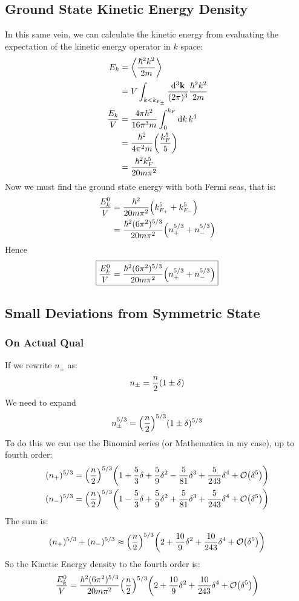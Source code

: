 \documentclass[12pt]{article}
\theoremstyle{plain}
\theoremstyle{definition}
\begin{document}
\subsection{Ground State Kinetic Energy Density}
In this same vein, we can calculate the kinetic energy from evaluating the expectation of the kinetic energy operator in $k$ space:
\begin{align*}
  E_k&=\ev{\frac{\hbar^2k^2}{2m}}\\
  &=V\int_{k<k_{F_\pm}}\frac{\dd[3]{\vb{k}}}{(2\pi)^3}\frac{\hbar^2k^2}{2m}\\
  \frac{E_k}{V}&=\frac{4\pi\hbar^2}{16\pi^3m}\int_0^{k_F}\dd{k}k^4\\
  &=\frac{\hbar^2}{4\pi^2m}\qty(\frac{k_F^5}{5})\\
  &=\frac{\hbar^2k_F^5}{20m\pi^2}
\end{align*}
Now we must find the ground state energy with both Fermi seas, that is:
\begin{align*}
  \frac{E_k^0}{V}&=\frac{\hbar^2}{20m\pi^2}\qty(k_{F_+}^5+k_{F_-}^5)\\
  &=\frac{\hbar^2(6\pi^2)^{5/3}}{20m\pi^2}\qty(n_+^{5/3}+n_-^{5/3})\\
\end{align*}
Hence
\begin{align*}
  \boxed{\frac{E_k^0}{V}
    =\frac{\hbar^2(6\pi^2)^{5/3}}{20m\pi^2}\qty(n_+^{5/3}+n_-^{5/3})}
\end{align*}
\subsection{Small Deviations from Symmetric State}

\subsubsection{On Actual Qual}
If we rewrite $n_\pm$ as:
\begin{align*}
  n_\pm=\frac{n}2\qty(1\pm\delta)
\end{align*}
We need to expand
\begin{align*}
  n_\pm^{5/3}=\qty(\frac{n}{2})^{5/3}(1\pm\delta)^{5/3}
\end{align*}
To do this we can use the Binomial series (or Mathematica in my case), up to fourth order:
\begin{align*}
  (n_+)^{5/3}&=\qty(\frac{n}2)^{5/3}\qty(1+\frac53\delta+\frac59\delta^2
  -\frac5{81}\delta^3+\frac5{243}\delta^4+\order{\delta^5})\\
  (n_-)^{5/3}&=\qty(\frac{n}2)^{5/3}\qty(1-\frac53\delta+\frac59\delta^2
  +\frac5{81}\delta^3+\frac5{243}\delta^4+\order{\delta^5})
\end{align*}
The sum is:
\begin{align*}
  (n_+)^{5/3}+(n_-)^{5/3}\approx\qty(\frac{n}2)^{5/3}
  \qty(2+\frac{10}9\delta^2+\frac{10}{243}\delta^4+\order{\delta^5})
\end{align*}
So the Kinetic Energy density to the fourth order is:
\begin{align*}
  \frac{E^0_k}{V}=\frac{\hbar^2(6\pi^2)^{5/3}}{20m\pi^2}\qty(\frac{n}2)^{5/3}
  \qty(2+\frac{10}9\delta^2+\frac{10}{243}\delta^4+\order{\delta^5})
\end{align*}
\end{document}
